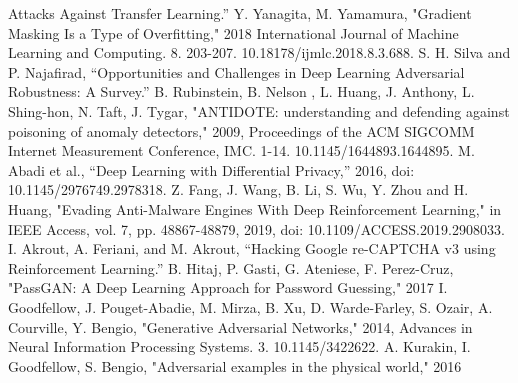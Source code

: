 \documentclass[11pt,conference]{IEEEtran}
\begin{document}
\begin{thebibliography}{00}
        Attacks Against Transfer Learning.”
     Y. Yanagita, M. Yamamura, "Gradient
        Masking Is a Type of Overfitting," 2018 International Journal of Machine
        Learning and Computing. 8. 203-207. 10.18178/ijmlc.2018.8.3.688.
     S. H. Silva and P. Najafirad, “Opportunities and
        Challenges in Deep Learning Adversarial Robustness: A Survey.”
     B. Rubinstein, B. Nelson , L. Huang, J. Anthony, L.
        Shing-hon, N. Taft, J. Tygar, "ANTIDOTE:
        understanding and defending against poisoning of anomaly detectors,"
        2009, Proceedings of the ACM SIGCOMM Internet Measurement Conference, IMC.
        1-14. 10.1145/1644893.1644895. 
     M. Abadi et al., “Deep Learning with Differential Privacy,”
        2016, doi: 10.1145/2976749.2978318.
     Z. Fang, J. Wang, B. Li, S. Wu, Y. Zhou and H. Huang,
        "Evading Anti-Malware Engines With Deep Reinforcement Learning," in
        IEEE Access, vol. 7, pp. 48867-48879, 2019, doi:
        10.1109/ACCESS.2019.2908033.
     I. Akrout, A. Feriani, and M. Akrout, “Hacking  Google
        re-CAPTCHA v3 using Reinforcement Learning.”
     B. Hitaj, P. Gasti, G. Ateniese, F. Perez-Cruz, "PassGAN: A Deep Learning Approach for
        Password Guessing," 2017
     I. Goodfellow, J. Pouget-Abadie, M. Mirza, B. Xu, D.
        Warde-Farley, S. Ozair, A. Courville, Y. Bengio, "Generative
        Adversarial Networks," 2014, Advances in Neural
        Information Processing Systems. 3. 10.1145/3422622. 
     A. Kurakin, I. Goodfellow, S. Bengio, "Adversarial examples
        in the physical world," 2016

\end{thebibliography}
\vspace{12pt}
\end{document}
